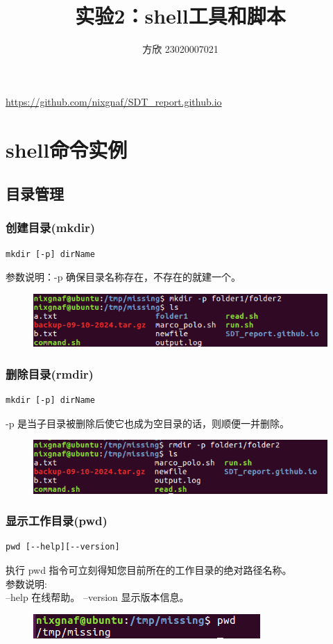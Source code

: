 \documentclass{article}
\title{实验2：shell工具和脚本}
\author{方欣 23020007021}
\date{}
\begin{document}
\maketitle

\url{https://github.com/nixgnaf/SDT_report.github.io}

\section{shell命令实例}
\subsection{目录管理}

\subsubsection{创建目录(mkdir)}
\begin{lstlisting}[style=myStyle]
mkdir [-p] dirName
\end{lstlisting}
参数说明：-p 确保目录名称存在，不存在的就建一个。
\begin{figure}[h]
    \centering
    \includegraphics[width=0.5\linewidth]{image8.png}
\end{figure}

\subsubsection{删除目录(rmdir)}
\begin{lstlisting}[style=myStyle]
mkdir [-p] dirName
\end{lstlisting}
-p 是当子目录被删除后使它也成为空目录的话，则顺便一并删除。
\begin{figure}[h]
    \centering
    \includegraphics[width=0.5\linewidth]{image9.png}
\end{figure}

\subsubsection{显示工作目录(pwd)}
\begin{lstlisting}[style=myStyle]
pwd [--help][--version]
\end{lstlisting}
执行 pwd 指令可立刻得知您目前所在的工作目录的绝对路径名称。\\
参数说明:\\
--help 在线帮助。
--version 显示版本信息。
\begin{figure}[h]
    \centering
    \includegraphics[width=0.5\linewidth]{image10.png}
\end{figure}
\end{document}
